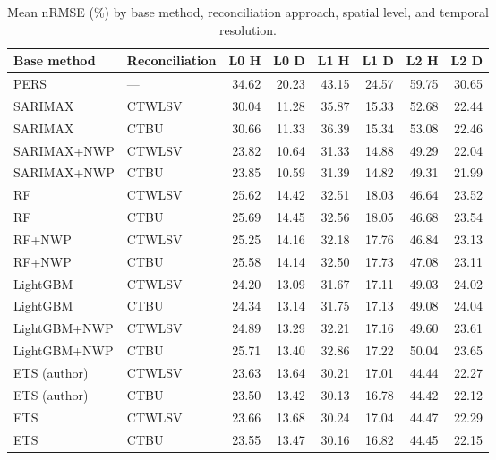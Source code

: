 \begin{table}[htbp]
\centering
\small
\caption{Mean nRMSE (\%) by base method, reconciliation approach, spatial level, and temporal resolution.}
\label{tab:nrmse}
\begin{tabular}{llrrrrrr}
\toprule
Base method & Reconciliation & L0 H & L0 D & L1 H & L1 D & L2 H & L2 D \\
\midrule
PERS & --- & 34.62 & 20.23 & 43.15 & 24.57 & 59.75 & 30.65 \\
\addlinespace
SARIMAX & CTWLSV & 30.04 & 11.28 & 35.87 & 15.33 & 52.68 & 22.44 \\
SARIMAX & CTBU & 30.66 & 11.33 & 36.39 & 15.34 & 53.08 & 22.46 \\
SARIMAX+NWP & CTWLSV & 23.82 & 10.64 & 31.33 & 14.88 & 49.29 & 22.04 \\
SARIMAX+NWP & CTBU & 23.85 & 10.59 & 31.39 & 14.82 & 49.31 & 21.99 \\
\addlinespace
RF & CTWLSV & 25.62 & 14.42 & 32.51 & 18.03 & 46.64 & 23.52 \\
RF & CTBU & 25.69 & 14.45 & 32.56 & 18.05 & 46.68 & 23.54 \\
RF+NWP & CTWLSV & 25.25 & 14.16 & 32.18 & 17.76 & 46.84 & 23.13 \\
RF+NWP & CTBU & 25.58 & 14.14 & 32.50 & 17.73 & 47.08 & 23.11 \\
\addlinespace
LightGBM & CTWLSV & 24.20 & 13.09 & 31.67 & 17.11 & 49.03 & 24.02 \\
LightGBM & CTBU & 24.34 & 13.14 & 31.75 & 17.13 & 49.08 & 24.04 \\
LightGBM+NWP & CTWLSV & 24.89 & 13.29 & 32.21 & 17.16 & 49.60 & 23.61 \\
LightGBM+NWP & CTBU & 25.71 & 13.40 & 32.86 & 17.22 & 50.04 & 23.65 \\
\addlinespace
ETS (author) & CTWLSV & 23.63 & 13.64 & 30.21 & 17.01 & 44.44 & 22.27 \\
ETS (author) & CTBU & 23.50 & 13.42 & 30.13 & 16.78 & 44.42 & 22.12 \\
ETS & CTWLSV & 23.66 & 13.68 & 30.24 & 17.04 & 44.47 & 22.29 \\
ETS & CTBU & 23.55 & 13.47 & 30.16 & 16.82 & 44.45 & 22.15 \\
\bottomrule
\end{tabular}
\end{table}

